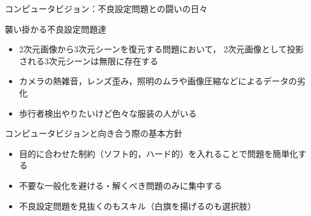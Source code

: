 \documentclass[10pt]{beamer}
\newcommand{\red}[1]{\textcolor{red}{#1}}
\newcommand{\blue}[1]{\textcolor{blue}{#1}}
\begin{document}
	\begin{frame}{コンピュータビジョン：不良設定問題との闘いの日々}
	
	    {\large 襲い掛かる不良設定問題達\blue{\Xey[1.5]}}
        \begin{itemize}
	        \item 2次元画像から3次元シーンを復元する問題において，
    	        2次元画像として投影される3次元シーンは無限に存在する
	        \item カメラの熱雑音，レンズ歪み，照明のムラや画像圧縮などによるデータの劣化
	        \item 歩行者検出やりたいけど色々な服装の人がいる
        \end{itemize}
	    {\large コンピュータビジョンと向き合う際の基本方針\red{\Cooley[1.5]}}
        \begin{itemize}
            \item 目的に合わせた制約（ソフト的，ハード的）を入れることで問題を簡単化する
            \item 不要な一般化を避ける・解くべき問題のみに集中する
            \item 不良設定問題を見抜くのもスキル（白旗を揚げるのも選択肢）
        \end{itemize}
        
	\end{frame}
	
\end{document}
